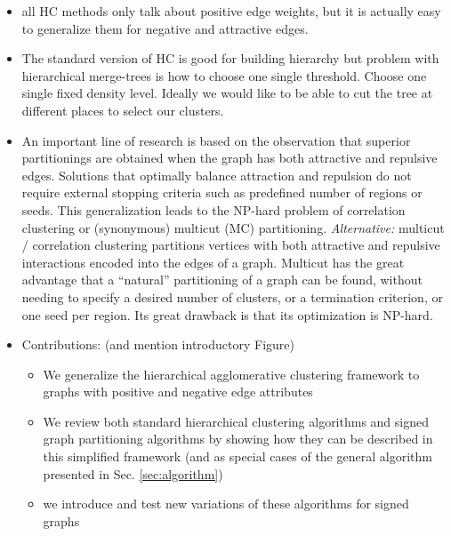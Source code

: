 \begin{itemize}
\begin{itemize}
\item all HC methods only talk about positive edge weights, but it is actually easy to generalize them for negative and attractive edges. 
\item The standard version of HC is good for building hierarchy but problem with hierarchical merge-trees is how to choose one single threshold. Choose one single fixed density level. Ideally we would like to be able to cut the tree at different places to select our clusters.
\item An important line of research is based on the observation that superior partitionings are obtained when the graph has both attractive and repulsive edges. Solutions that optimally balance attraction and repulsion do not require external stopping criteria such as predefined number of regions or seeds. This generalization leads to the NP-hard problem of correlation clustering or (synonymous) multicut (MC) partitioning. \emph{Alternative:} multicut / correlation clustering partitions vertices with both attractive and repulsive interactions encoded into the edges of a graph. Multicut has the great advantage that a “natural” partitioning of a graph can be found, without needing to specify a desired number of clusters, or a termination criterion, or one seed per region. Its great drawback is that its optimization is NP-hard.

\item Contributions: (and mention introductory Figure)
\begin{itemize}
\item We generalize the hierarchical agglomerative clustering framework to graphs with positive and negative edge attributes
\item We review both standard hierarchical clustering algorithms and signed graph partitioning algorithms by showing how they can be described in this simplified framework (and as special cases of the general algorithm presented in Sec. \ref{sec:algorithm})
\item we introduce and test new variations of these algorithms for signed graphs
\end{itemize}
\end{itemize}


\end{itemize}

